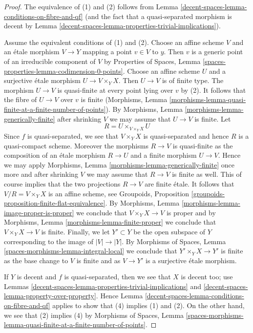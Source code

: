 \begin{proof}
The equivalence of (1) and (2) follows from
Lemma \ref{decent-spaces-lemma-conditions-on-fibre-and-qf}
(and the fact that a quasi-separated morphism is decent by
Lemma \ref{decent-spaces-lemma-properties-trivial-implications}).

\medskip\noindent
Assume the equivalent conditions of (1) and (2). Choose an affine scheme $V$
and an \'etale morphism $V \to Y$ mapping a point $v \in V$ to $y$. Then $v$
is a generic point of an irreducible component of $V$ by
Properties of Spaces, Lemma
\ref{spaces-properties-lemma-codimension-0-points}.
Choose an affine scheme $U$
and a surjective \'etale morphism $U \to V \times_Y X$. Then $U \to V$ is of
finite type. The morphism $U \to V$ is quasi-finite at every point lying over
$v$ by (2). It follows that the fibre of $U \to V$ over $v$ is finite
(Morphisms, Lemma
\ref{morphisms-lemma-quasi-finite-at-a-finite-number-of-points}). By
Morphisms, Lemma \ref{morphisms-lemma-generically-finite}
after shrinking $V$ we may assume that $U \to V$ is finite.
Let
$$
R = U \times_{V \times_Y X} U
$$
Since $f$ is quasi-separated, we see that $V \times_Y X$ is quasi-separated
and hence $R$ is a quasi-compact scheme. Moreover the morphisms
$R \to V$ is quasi-finite as the composition of an \'etale morphism
$R \to U$ and a finite morphism $U \to V$. Hence we may apply
Morphisms, Lemma \ref{morphisms-lemma-generically-finite}
once more and after shrinking $V$ we may assume that $R \to V$ is
finite as well. This of course implies that the two projections
$R \to V$ are finite \'etale. It follows that
$V/R = V \times_Y X$ is an affine scheme, see
Groupoids, Proposition \ref{groupoids-proposition-finite-flat-equivalence}.
By Morphisms, Lemma \ref{morphisms-lemma-image-proper-is-proper}
we conclude that $V \times_Y X \to V$ is proper and by
Morphisms, Lemma \ref{morphisms-lemma-finite-proper}
we conclude that $V \times_Y X \to V$ is finite.
Finally, we let $Y' \subset Y$ be the open subspace of $Y$
corresponding to the image of $|V| \to |Y|$.
By Morphisms of Spaces, Lemma \ref{spaces-morphisms-lemma-integral-local}
we conclude that $Y' \times_Y X \to Y'$ is finite as the base
change to $V$ is finite and as $V \to Y'$ is a surjective \'etale
morphism.

\medskip\noindent
If $Y$ is decent and $f$ is quasi-separated, then we see that
$X$ is decent too; use Lemmas
\ref{decent-spaces-lemma-properties-trivial-implications} and
\ref{decent-spaces-lemma-property-over-property}.
Hence Lemma \ref{decent-spaces-lemma-conditions-on-fibre-and-qf}
applies to show that (4) implies (1) and (2). On the other hand,
we see that (2) implies (4) by Morphisms of Spaces, Lemma
\ref{spaces-morphisms-lemma-quasi-finite-at-a-finite-number-of-points}.
\end{proof}

